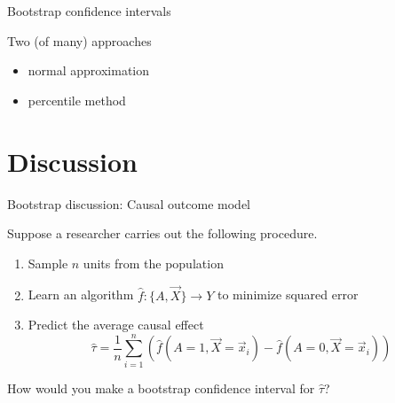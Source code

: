\documentclass{beamer}
\begin{document}
\begin{frame}{Bootstrap confidence intervals}

Two (of many) approaches
\begin{itemize}
\item normal approximation
\item percentile method
\end{itemize}

\end{frame}



\section{Discussion}

\begin{frame}{Bootstrap discussion: Causal outcome model}

Suppose a researcher carries out the following procedure.

\begin{enumerate}
\item Sample $n$ units from the population
\item Learn an algorithm $\hat{f}:\{A,\vec{X}\}\rightarrow Y$ to minimize squared error
\item Predict the average causal effect
$$
\hat\tau = \frac{1}{n}\sum_{i=1}^n\left(\hat{f}(A = 1,\vec{X} = \vec{x}_i) - \hat{f}(A = 0,\vec{X} = \vec{x}_i)\right)
$$
\end{enumerate}

How would you make a bootstrap confidence interval for $\hat\tau$? \pause

\end{frame}
\end{document}
